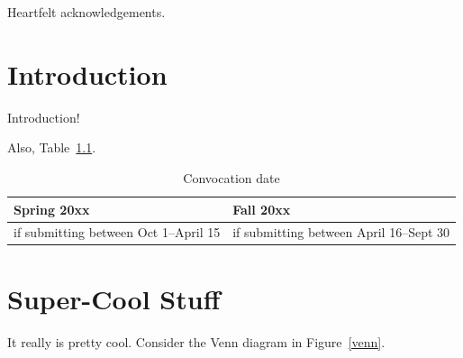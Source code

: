\documentclass[12pt,openany,oneside]{report}
\begin{document}

\begin{acknowledgement}
  Heartfelt acknowledgements.
\end{acknowledgement}

\beforebodyoftex


\tableofcontents

\listoftables

\listoffigures

\beginbodyoftex



\chapter{Introduction}

Introduction!

Also, Table~\ref{egtable}.

\begin{table}[htbp]
  \begin{center}
    \begin{tabular}{|p{4cm}|p{4cm}|}
      \hline
      Spring 20xx & Fall 20xx \\
      \hline
      \hline
      if submitting between Oct 1--April 15
      & if submitting between April 16--Sept 30\\
      \hline
    \end{tabular}
    \caption{Convocation date}
    \label{egtable}
  \end{center}
\end{table}


\chapter{Super-Cool Stuff}

It really is pretty cool.  Consider the Venn diagram in Figure~\ref{venn}.
\end{document}
